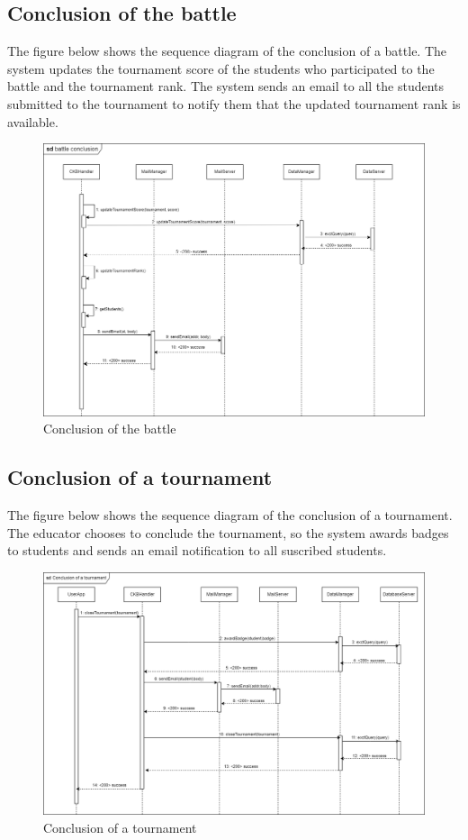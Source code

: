\subsection{Conclusion of the battle}
The figure below shows the sequence diagram of the conclusion of a battle. The system updates the tournament
score of the students who participated to the battle and the tournament rank. The system sends an email to all the students submitted
to the tournament to notify them that the updated tournament rank is available.
\begin{figure}[H]
    \centering
    \includegraphics[width=1\textwidth]{images/seq_diagrams/battle_conclusion_DD.png}
    \caption{Conclusion of the battle}
\end{figure}
\clearpage

\subsection{Conclusion of a tournament}
The figure below shows the sequence diagram of the conclusion of a tournament. The educator chooses to conclude the tournament, so the system 
awards badges to students and sends an email notification to all suscribed students.
\begin{figure}[H]
    \centering
    \includegraphics[width=1\textwidth]{images/seq_diagrams/tournament_conclusion_DD.png}
    \caption{Conclusion of a tournament}
\end{figure}
\clearpage


